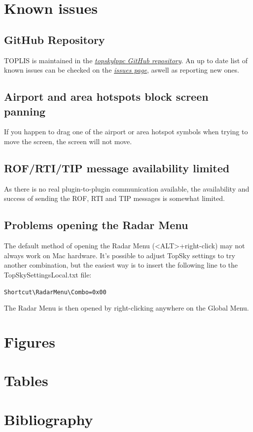 \documentclass[a4paper,oneside,11pt]{memoir}
\begin{document}
\chapter{Known issues}

\section{GitHub Repository}
TOPLIS is maintained in the \textit{\href{https://github.com/pinatacolada/topskylppc}{topskylppc GitHub repository}}. An up to date list of known issues can be checked on the \textit{\href{https://github.com/pinatacolada/topskylppc/issues}{issues page}}, aswell as reporting new ones.

\section{Airport and area hotspots block screen panning}

If you happen to drag one of the airport or area hotspot symbols when trying to move the screen, the screen will not move.

\section{ROF/RTI/TIP message availability limited}

As there is no real plugin-to-plugin communication available, the availability and success of sending the ROF, RTI and TIP messages is somewhat limited.

\section{Problems opening the Radar Menu}

The default method of opening the Radar Menu (<ALT>+right-click) may not always work on Mac hardware. It’s possible to adjust TopSky settings to try another combination, but the easiest way is to insert the following line to the TopSkySettingsLocal.txt file:

\verb|Shortcut\RadarMenu\Combo=0x00|

The Radar Menu is then opened by right-clicking anywhere on the Global Menu.

\appendix

\chapter{Figures}

\begin{KeepFromToc}
\listoffigures
\end{KeepFromToc}

\chapter{Tables}

\begin{KeepFromToc}
\listoftables
\end{KeepFromToc}

\chapter{Bibliography}
\begin{KeepFromToc}
\nocite{*}
\printbibliography
\end{KeepFromToc}
\end{document}
